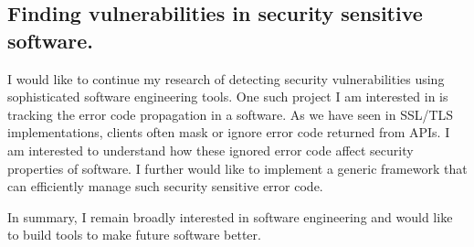 \documentclass[a4paper, 11pt]{article}
\begin{document}
\begin{small}
\subsection*{\small Finding vulnerabilities in security sensitive software.} 
I would like to continue my research of detecting security vulnerabilities using sophisticated software engineering tools. 
One such project I am interested in is tracking the error code propagation in a software. As we have seen in SSL/TLS implementations, 
clients often mask or ignore error code returned from APIs. I am interested to understand how these ignored error code affect security 
properties of software. I further would like to implement a generic framework that can efficiently manage such security sensitive error code.

\vspace*{1\baselineskip}
\noindent
In summary, I remain broadly interested in software engineering and would like to build tools to make future software better.



\end{small}
\begin{footnotesize}


\end{footnotesize}
\end{document}
